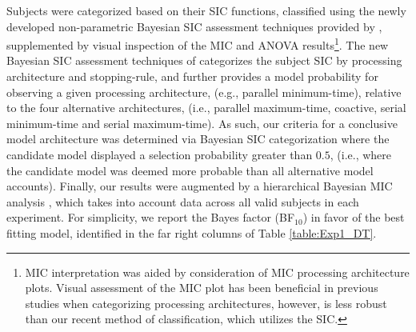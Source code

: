 Subjects were categorized based on their SIC functions, classified using the newly developed non-parametric Bayesian SIC assessment techniques provided by , supplemented by visual inspection of the MIC and ANOVA results\footnote{MIC interpretation was aided by consideration of MIC processing architecture plots. Visual assessment of the MIC plot has been beneficial in previous studies when categorizing processing architectures, however, is less robust than our recent method of classification, which utilizes the SIC.}. The new Bayesian SIC assessment techniques of  categorizes the subject SIC by processing architecture and stopping-rule, and further provides a model probability for observing a given processing architecture, (e.g., parallel minimum-time), relative to the four alternative architectures, (i.e., parallel maximum-time, coactive, serial minimum-time and serial maximum-time). As such, our criteria for a conclusive model architecture was determined via Bayesian SIC categorization where the candidate model displayed a selection probability greater than $0.5$, (i.e., where the candidate model was deemed more probable than all alternative model accounts). Finally, our results were augmented by a hierarchical Bayesian MIC analysis \cite{houpt2017hierarchical}, which takes into account data across all valid subjects in each experiment. For simplicity, we report the Bayes factor (BF$_{10}$) in favor of the best fitting model, identified in the far right columns of Table \ref{table:Exp1_DT}. 

